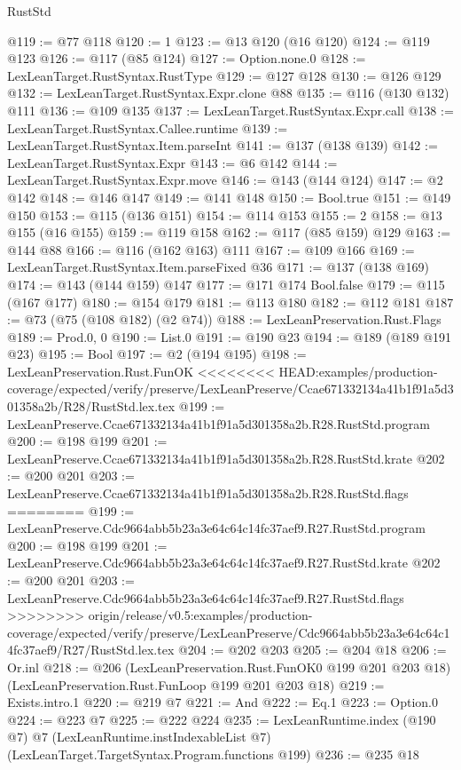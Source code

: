 \begin{lexlean}{RustStd}
\begin{coremodule}
{\begin{coremodule}
{{{{{@119 := @77 @118
@120 := 1
@123 := @13 @120 (@16 @120)
@124 := @119 @123
@126 := @117 (@85 @124)
@127 := Option.none.{0}
@128 := LexLeanTarget.RustSyntax.RustType
@129 := @127 @128
@130 := @126 @129
@132 := LexLeanTarget.RustSyntax.Expr.clone @88
@135 := @116 (@130 @132) @111
@136 := @109 @135
@137 := LexLeanTarget.RustSyntax.Expr.call
@138 := LexLeanTarget.RustSyntax.Callee.runtime
@139 := LexLeanTarget.RustSyntax.Item.parseInt
@141 := @137 (@138 @139)
@142 := LexLeanTarget.RustSyntax.Expr
@143 := @6 @142
@144 := LexLeanTarget.RustSyntax.Expr.move
@146 := @143 (@144 @124)
@147 := @2 @142
@148 := @146 @147
@149 := @141 @148
@150 := Bool.true
@151 := @149 @150
@153 := @115 (@136 @151)
@154 := @114 @153
@155 := 2
@158 := @13 @155 (@16 @155)
@159 := @119 @158
@162 := @117 (@85 @159) @129
@163 := @144 @88
@166 := @116 (@162 @163) @111
@167 := @109 @166
@169 := LexLeanTarget.RustSyntax.Item.parseFixed @36
@171 := @137 (@138 @169)
@174 := @143 (@144 @159) @147
@177 := @171 @174 Bool.false
@179 := @115 (@167 @177)
@180 := @154 @179
@181 := @113 @180
@182 := @112 @181
@187 := @73 (@75 (@108 @182) (@2 @74))
@188 := LexLeanPreservation.Rust.Flags
@189 := Prod.{0, 0}
@190 := List.{0}
@191 := @190 @23
@194 := @189 (@189 @191 @23)
@195 := Bool
@197 := @2 (@194 @195)
@198 := LexLeanPreservation.Rust.FunOK
<<<<<<<< HEAD:examples/production-coverage/expected/verify/preserve/LexLeanPreserve/Ccae671332134a41b1f91a5d301358a2b/R28/RustStd.lex.tex
@199 := LexLeanPreserve.Ccae671332134a41b1f91a5d301358a2b.R28.RustStd.program
@200 := @198 @199
@201 := LexLeanPreserve.Ccae671332134a41b1f91a5d301358a2b.R28.RustStd.krate
@202 := @200 @201
@203 := LexLeanPreserve.Ccae671332134a41b1f91a5d301358a2b.R28.RustStd.flags
========
@199 := LexLeanPreserve.Cdc9664abb5b23a3e64c64c14fc37aef9.R27.RustStd.program
@200 := @198 @199
@201 := LexLeanPreserve.Cdc9664abb5b23a3e64c64c14fc37aef9.R27.RustStd.krate
@202 := @200 @201
@203 := LexLeanPreserve.Cdc9664abb5b23a3e64c64c14fc37aef9.R27.RustStd.flags
>>>>>>>> origin/release/v0.5:examples/production-coverage/expected/verify/preserve/LexLeanPreserve/Cdc9664abb5b23a3e64c64c14fc37aef9/R27/RustStd.lex.tex
@204 := @202 @203
@205 := @204 @18
@206 := Or.inl
@218 := @206
    (LexLeanPreservation.Rust.FunOK0 @199 @201 @203 @18)
    (LexLeanPreservation.Rust.FunLoop @199 @201 @203 @18)
@219 := Exists.intro.{1}
@220 := @219 @7
@221 := And
@222 := Eq.{1}
@223 := Option.{0}
@224 := @223 @7
@225 := @222 @224
@235 := LexLeanRuntime.index
    (@190 @7)
    @7
    (LexLeanRuntime.instIndexableList @7)
    (LexLeanTarget.TargetSyntax.Program.functions @199)
@236 := @235 @18
}}}}}
\end{coremodule}}
\end{coremodule}
\end{lexlean}
